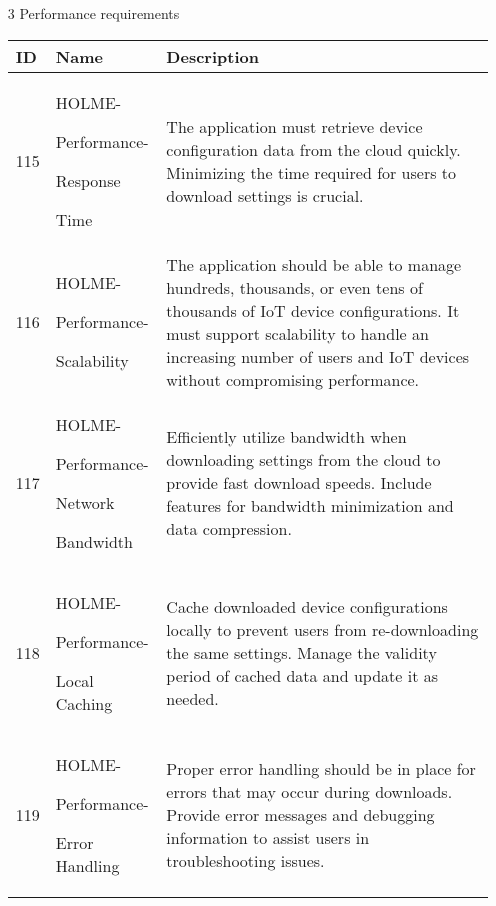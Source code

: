 \documentclass[conference]{IEEEtran}
\begin{document}
\begin{enumerate}
\item[3] Performance requirements
\begin{table}[h]
\def\arraystretch{1.2} \small
    \begin{tabular}{|p{1cm}|p{1.8cm}|p{5.0cm}|}
        \hline
        ID & Name & Description\\ \hline
        115 \par  & HOLME-\par Performance-\par Response \par Time  &The application must retrieve device configuration data from the cloud quickly. Minimizing the time required for users to download settings is crucial.  \\ \hline
        116 \par  & HOLME-\par Performance-\par Scalability & The application should be able to manage hundreds, thousands, or even tens of thousands of IoT device configurations. It must support scalability to handle an increasing number of users and IoT devices without compromising performance. \\ \hline
        117 \par  & HOLME-\par Performance-\par Network \par Bandwidth & Efficiently utilize bandwidth when downloading settings from the cloud to provide fast download speeds. Include features for bandwidth minimization and data compression. \\ \hline
        118 \par  & HOLME-\par Performance-\par Local Caching & Cache downloaded device configurations locally to prevent users from re-downloading the same settings. Manage the validity period of cached data and update it as needed. \\ \hline
         119 \par  & HOLME-\par Performance-\par Error Handling & Proper error handling should be in place for errors that may occur during downloads. Provide error messages and debugging information to assist users in troubleshooting issues. \\ \hline
    \end{tabular}
\end{table}
\vspace{3cm}


\end{enumerate}
\end{document}
